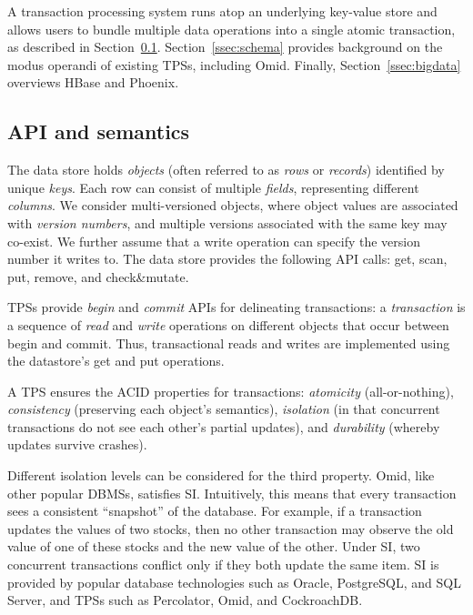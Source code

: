 A transaction processing system runs atop an underlying 
key-value store and allows users to bundle multiple data operations 
into a single atomic transaction, as described in 
Section~\ref{ssec:data-model}. Section~\ref{ssec:schema} provides  background on the modus operandi 
of existing TPSs,  including Omid. Finally, Section~\ref{ssec:bigdata} overviews HBase and Phoenix. 

\subsection{API and semantics}
\label{ssec:data-model}

The  data store holds  \emph{objects} (often referred to as \emph{rows} or {\em records}) identified by unique \emph{keys}.
Each row can consist of multiple \emph{fields}, representing different \emph{columns}. 
We consider multi-versioned objects, where object values are associated with \emph{version numbers}, and
multiple versions associated with the same key may co-exist.
We further assume that a write operation can specify the version number it writes to.
The  data store provides the following API calls: get, scan, put, remove, and check\&mutate. 

TPSs provide \emph{begin} and \emph{commit} APIs for delineating transactions: 
a \emph{transaction} is a sequence of \emph{read} and \emph{write} operations on different objects 
that occur between begin and commit. {}
Thus, transactional reads and writes are implemented using the 
datastore's get and put operations.

A TPS  ensures the ACID properties for transactions:
\emph{atomicity} (all-or-nothing), \emph{consistency} (preserving each object's semantics), 
\emph{isolation} (in that concurrent transactions do not see each other's partial updates), and 
\emph{durability} (whereby updates survive crashes).

Different isolation levels can be considered for the third property. Omid, like other popular DBMSs,  
satisfies SI. Intuitively, this means that every transaction sees a 
consistent ``snapshot'' of the  database. For example, if a transaction updates the values of two stocks, 
then no other transaction may observe the old value of one of these stocks and the new value of the other.
Under SI, two concurrent transactions conflict only if they both {update} the same item.  
SI is provided by popular database technologies such as Oracle, PostgreSQL, and SQL Server,
and TPSs such as Percolator, Omid, and  CockroachDB.

